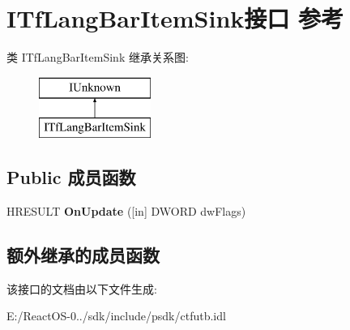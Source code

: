 \hypertarget{interface_i_tf_lang_bar_item_sink}{}\section{I\+Tf\+Lang\+Bar\+Item\+Sink接口 参考}
\label{interface_i_tf_lang_bar_item_sink}
类 I\+Tf\+Lang\+Bar\+Item\+Sink 继承关系图\+:\begin{figure}[H]
\begin{center}
\leavevmode
\includegraphics[height=2.000000cm]{interface_i_tf_lang_bar_item_sink}
\end{center}
\end{figure}
\subsection*{Public 成员函数}
\begin{DoxyCompactItemize}
\item 
\mbox{\label{interface_i_tf_lang_bar_item_sink_a62e60c143695db78b46fd06ce0a0df10}} 
H\+R\+E\+S\+U\+LT {\bfseries On\+Update} (\mbox{[}in\mbox{]} D\+W\+O\+RD dw\+Flags)
\end{DoxyCompactItemize}
\subsection*{额外继承的成员函数}


该接口的文档由以下文件生成\+:\begin{DoxyCompactItemize}
\item 
E\+:/\+React\+O\+S-\/0../sdk/include/psdk/ctfutb.\+idl\end{DoxyCompactItemize}
